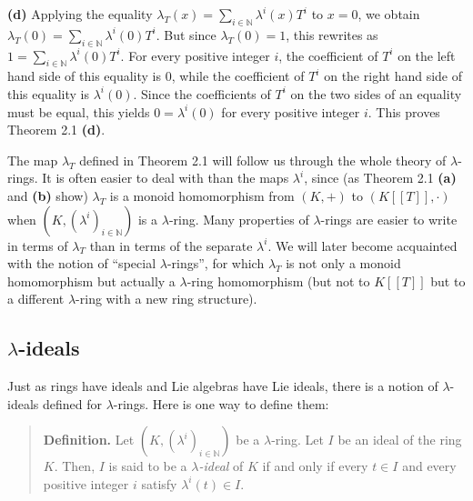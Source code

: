 \documentclass[numbers=enddot,12pt,final,onecolumn,notitlepage]{scrartcl}%
\begin{document}
\textbf{(d)} Applying the equality $\lambda_{T}\left(  x\right)
=\sum\limits_{i\in\mathbb{N}}\lambda^{i}\left(  x\right)  T^{i}$ to $x=0$, we
obtain $\lambda_{T}\left(  0\right)  =\sum\limits_{i\in\mathbb{N}}\lambda
^{i}\left(  0\right)  T^{i}$. But since $\lambda_{T}\left(  0\right)  =1$,
this rewrites as $1=\sum\limits_{i\in\mathbb{N}}\lambda^{i}\left(  0\right)
T^{i}$. For every positive integer $i$, the coefficient of $T^{i}$ on the left
hand side of this equality is $0$, while the coefficient of $T^{i}$ on the
right hand side of this equality is $\lambda^{i}\left(  0\right)  $. Since the
coefficients of $T^{i}$ on the two sides of an equality must be equal, this
yields $0=\lambda^{i}\left(  0\right)  $ for every positive integer $i$. This
proves Theorem 2.1 \textbf{(d)}.

The map $\lambda_{T}$ defined in Theorem 2.1 will follow us through the whole
theory of $\lambda$-rings. It is often easier to deal with than the maps
$\lambda^{i}$, since (as Theorem 2.1 \textbf{(a)} and \textbf{(b)} show)
$\lambda_{T}$ is a monoid homomorphism from $\left(  K,+\right)  $ to $\left(
K\left[  \left[  T\right]  \right]  ,\cdot\right)  $ when $\left(  K,\left(
\lambda^{i}\right)  _{i\in\mathbb{N}}\right)  $ is a $\lambda$-ring. Many
properties of $\lambda$-rings are easier to write in terms of $\lambda_{T}$
than in terms of the separate $\lambda^{i}$. We will later become acquainted
with the notion of ``special $\lambda$-rings'', for which $\lambda_{T}$ is not
only a monoid homomorphism but actually a $\lambda$-ring homomorphism (but not
to $K\left[  \left[  T\right]  \right]  $ but to a different $\lambda$-ring
with a new ring structure).

\subsection{$\lambda$-ideals}

Just as rings have ideals and Lie algebras have Lie ideals, there is a notion
of $\lambda$-ideals defined for $\lambda$-rings. Here is one way to define them:

\begin{quote}
\textbf{Definition.} Let $\left(  K,\left(  \lambda^{i}\right)  _{i\in
\mathbb{N}}\right)  $ be a $\lambda$-ring. Let $I$ be an ideal of the ring
$K$. Then, $I$ is said to be a $\lambda$\textit{-ideal} of $K$ if and only if
every $t\in I$ and every positive integer $i$ satisfy $\lambda^{i}\left(
t\right)  \in I$.
\end{quote}
\end{document}
